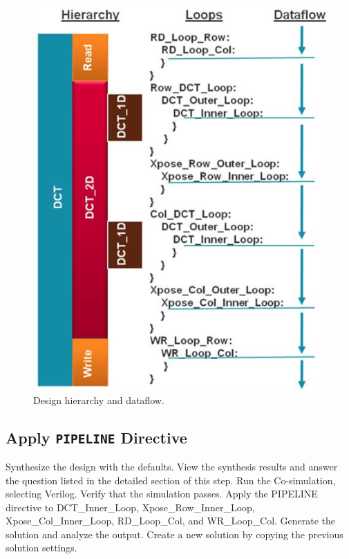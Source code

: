 \documentclass[a4paper,12pt,twoside]{article}
\begin{document}
\begin{enumerate}
\begin{figure}[H]
        \includegraphics[width=\textwidth]{images/12.png}
        \caption{Design hierarchy and dataflow.}
    \end{figure}
\end{enumerate}
\subsection{Apply \texttt{PIPELINE} Directive}\label{S34}
Synthesize the design with the defaults. View the synthesis results and answer the question listed in the detailed section of this step. Run the Co-simulation, selecting Verilog. Verify that the simulation passes. Apply the PIPELINE directive to DCT\_Inner\_Loop, Xpose\_Row\_Inner\_Loop, Xpose\_Col\_Inner\_Loop, RD\_Loop\_Col, and WR\_Loop\_Col. Generate the solution and analyze the output. Create a new solution by copying the previous solution settings. 
\end{document}
